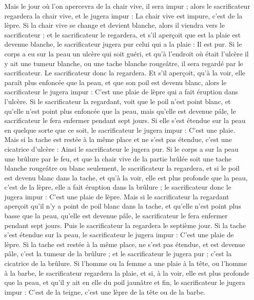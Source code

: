 \begin{multicols}{2}
Mais le jour où l'on apercevra de la chair vive, il sera impur ;
alors le sacrificateur regardera la chair vive, et le jugera impur : La chair vive est impure, c'est de la lèpre.
Si la chair vive se change et devient blanche, alors il viendra vers le sacrificateur ;
et le sacrificateur le regardera, et s’il aperçoit que est la plaie est devenue blanche, le sacrificateur jugera pur celui qui a la plaie : Il est pur.
Si le corps a eu sur la peau un ulcère qui soit guéri,
et qu'à l'endroit où était l'ulcère il y ait une tumeur blanche, ou une tache blanche rougeâtre, il sera regardé par le sacrificateur.
Le sacrificateur donc la regardera. Et s'il aperçoit, qu'à la voir, elle paraît plus enfoncée que la peau, et que son poil est devenu blanc, alors le sacrificateur le jugera impur : C'est une plaie de lèpre qui a fait éruption dans l'ulcère.
Si le sacrificateur la regardant, voit que le poil n'est point blanc, et qu'elle n'est point plus enfoncée que la peau, mais qu'elle est devenue pâle, le sacrificateur le fera enfermer pendant sept jours.
Si elle s'est étendue sur la peau en quelque sorte que ce soit, le sacrificateur le jugera impur : C'est une plaie.
Mais si la tache est restée à la même place et ne s'est pas étendue, c'est une cicatrice d'ulcère : Ainsi le sacrificateur le jugera pur.
Si le corps a sur la peau une brûlure par le feu, et que la chair vive de la partie brûlée soit une tache blanche rougeâtre ou blanc seulement, le sacrificateur la regardera,
et si le poil est devenu blanc dans la tache, et qu'à la voir, elle est plus profonde que la peau, c'est de la lèpre, elle a fait éruption dans la brûlure ; le sacrificateur donc le jugera impur : C'est une plaie de lèpre.
Mais si le sacrificateur la regardant aperçoit qu'il n'y a point de poil blanc dans la tache, et qu'elle n'est point plus basse que la peau, qu'elle est devenue pâle, le sacrificateur le fera enfermer pendant sept jours.
Puis le sacrificateur la regardera le septième jour. Si la tache s'est étendue sur la peau, le sacrificateur le jugera impur : C'est une plaie de lèpre.
Si la tache est restée à la même place, ne s'est pas étendue, et est devenue pâle, c'est la tumeur de la brûlure ; et le sacrificateur le jugera pur ; c'est la cicatrice de la brûlure.
Si l'homme ou la femme a une plaie à la tête, ou l'homme à la barbe,
le sacrificateur regardera la plaie, et si, à la voir, elle est plus profonde que la peau, et qu'il y ait en elle du poil jaunâtre et fin, le sacrificateur le jugera impur : C'est de la teigne, c'est une lèpre de la tête ou de la barbe.

\end{multicols}
